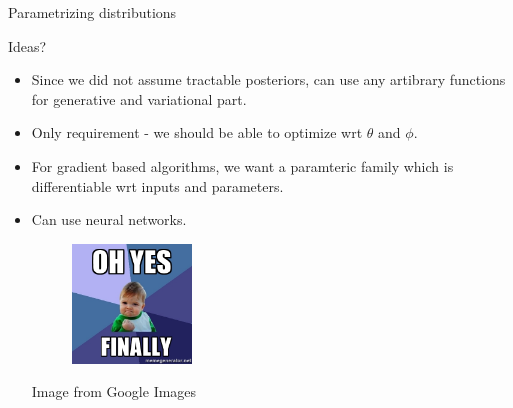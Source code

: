 \documentclass{beamer}
\begin{document}
\begin{frame}{Parametrizing distributions}

    {\color{red} Ideas?}
    \begin{itemize}
        \item {
            \pause
            Since we did not assume tractable posteriors, can use any artibrary functions for generative and variational part.
        }
        \item {
            Only requirement - we should be able to optimize wrt $\theta$ and $\phi$.
        }
        \item {
            For gradient based algorithms, we want a paramteric family which is differentiable wrt inputs and parameters.
        }
        \item{
            Can use neural networks.
            \pause
            \begin{figure}
                \centering
                \includegraphics[width=0.3\textwidth]{finally}
            \end{figure}
        }
        {\small Image from Google Images}
      \end{itemize}
\end{frame}
\end{document}
